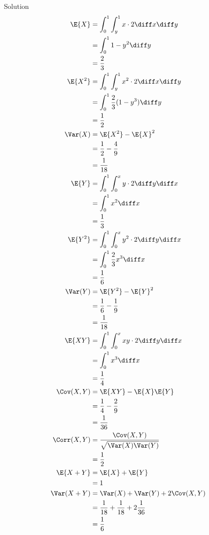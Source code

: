 \documentclass{article}
\theoremstyle{plain}
\theoremstyle{definition}
\theoremstyle{remark}
\begin{document}
\begin{solution}
    {Solution}
    \begin{align*}
        \E{X}
        &= \int_{0}^{1}\int_{y}^{1}x\cdot 2\diff x \diff y \\
        &= \int_{0}^{1}1-y^2\diff y \\
        &= \frac{2}{3} \\
        \E{X^2}
        &= \int_{0}^{1}\int_{y}^{1}x^2\cdot 2\diff x \diff y \\
        &= \int_{0}^{1}\frac{2}{3}(1-y^3)\diff y \\
        &= \frac{1}{2} \\
        \Var(X)
        &= \E{X^2}-\E{X}^2 \\
        &= \frac{1}{2}-\frac{4}{9} \\
        &= \frac{1}{18} \\
        \E{Y}
        &= \int_{0}^{1}\int_{0}^{x}y\cdot 2\diff y \diff x \\
        &= \int_{0}^{1}x^2\diff x \\
        &= \frac{1}{3} \\
        \E{Y^2}
        &= \int_{0}^{1}\int_{0}^{x}y^2\cdot 2\diff y \diff x \\
        &= \int_{0}^{1}\frac{2}{3}x^3\diff x \\
        &= \frac{1}{6} \\
        \Var(Y)
        &= \E{Y^2}-\E{Y}^2 \\
        &= \frac{1}{6}-\frac{1}{9} \\
        &= \frac{1}{18} \\
        \E{XY}
        &= \int_{0}^{1}\int_{0}^{x}xy\cdot 2\diff y \diff x \\
        &= \int_{0}^{1}x^3\diff x \\
        &= \frac{1}{4} \\
        \Cov(X,Y)
        &= \E{XY}-\E{X}\E{Y} \\
        &= \frac{1}{4}-\frac{2}{9} \\
        &= \frac{1}{36} \\
        \Corr(X,Y)
        &= \frac{\Cov(X,Y)}{\sqrt{\Var(X)\Var(Y)}} \\
        &= \frac{1}{2} \\
        \E{X+Y}
        &= \E{X}+\E{Y} \\
        &= 1 \\
        \Var(X+Y)
        &= \Var(X)+\Var(Y)+2\Cov(X,Y) \\
        &= \frac{1}{18}+\frac{1}{18}+2\frac{1}{36} \\
        &= \frac{1}{6}
    \end{align*}
\end{solution}
\end{document}
